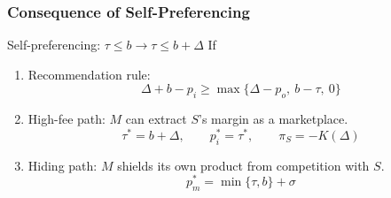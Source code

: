 \begin{frame}
  \frametitle{Consequence of Self-Preferencing}
\begin{block}{Self-preferencing: $\tau \leq b \to \tau \leq b+\Delta$}
  If 

  \vspace{0.2cm}
  \begin{enumerate}
    \item Recommendation rule: 
    \begin{equation}
      \Delta+b-p_i
      \geq
      \max\{\Delta-p_o,\ b-\tau,\ 0\}
    \end{equation}


    \item High-fee path: $M$ can extract $S$'s margin as a marketplace.
    \begin{equation}
      \tau^*=b+\Delta,\qquad
      p_i^*=\tau^*,\qquad
      \pi_S=-K(\Delta)
    \end{equation}

    \item Hiding path: $M$ shields its own product from competition with $S$.
    \begin{equation}
      p_m^*=\min\{\tau,b\}+\sigma
    \end{equation}
  \end{enumerate}
\end{block}
\end{frame}

